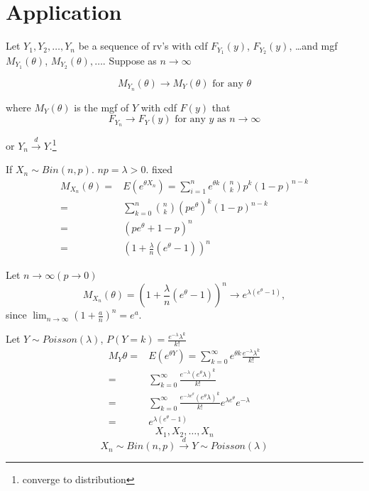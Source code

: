 \section{Application}
\begin{theo}
Let $Y_1,Y_2,\dots,Y_n$ be a sequence of rv's with cdf $F_{Y_1}(y)$, $F_{Y_2}(y)$, \dots and mgf $M_{Y_1}(\theta)$, $M_{Y_2}(\theta),\dots $. Suppose as $n \to\infty$ 

\[M_{Y_n}(\theta) \rightarrow M_Y(\theta) \text{ for any }\theta\]

where $M_Y(\theta)$ is the mgf of $Y$ with cdf $F(y)$ that
\[F_{Y_n} \rightarrow F_Y(y) \text{ for any }y \text{ as }n \to \infty\]

or $Y_n\overset{d}{\longrightarrow} Y$.\footnote{converge to distribution}
\end{theo}

\begin{exmp}
If $X_n\sim Bin(n,p)$. $np=\lambda>0$. fixed
\begin{align*}
M_{X_n}(\theta)= & E(e^{\theta X_n}) =\sum_{i=1}^n e^{\theta k} 
{\binom{n}{k} } p^k (1-p)^{n-k}\\
= & \sum_{k=0}^n {\binom{n}{k}} (pe^{\theta})^k (1-p)^{n-k} \\
= & (pe^{\theta}+1-p)^n \\
= & \left(1+\frac{\lambda}{n}(e^{\theta}-1)\right)^n 
\end{align*}

Let $n \to \infty (p\to 0)$
\[M_{X_n}(\theta)=  \left(1+\frac{\lambda}{n}(e^{\theta}-1)\right)^n \longrightarrow e^{\lambda(e^{\theta}-1)},\]
since $\lim_{n\to \infty}\left(1+\frac{a}{n}\right)^n=e^a$.

Let $Y \sim Poisson(\lambda)$, $P(Y=k)=\frac{e^{-\lambda}\lambda^k}{k!}$
\begin{align*}
M_Y{\theta}= & E(e^{\theta Y}) =\sum_{k=0}^{\infty} e^{\theta k} \frac{e^{-\lambda}\lambda^k}{k!} \\
= & \sum_{k=0}^{\infty} \frac{e^{-\lambda}(e^{\theta} \lambda)^k}{k!} \\
= &  \sum_{k=0}^{\infty} \frac{e^{-\lambda e^{\theta}}(e^{\theta} \lambda)^k}{k!}  e^{\lambda e^{\theta}} e^{-\lambda} \\
= & e^{\lambda (e^{\theta}-1)} 
\end{align*}
\[X_1, X_2,\dots,X_n\]
\[X_n \sim Bin(n,p) \overset{d}{\longrightarrow} Y\sim Poisson(\lambda)\]
\end{exmp}


